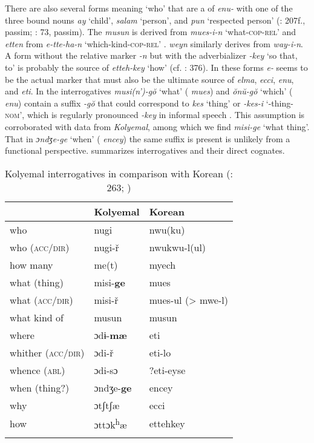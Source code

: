 There are also several forms meaning ‘who’ that are a  of \textit{enu-} with one of the three bound nouns \textit{ay} ‘child’, \textit{salam} ‘person’, and \textit{pun} ‘respected person’ (\citealt{Sohn1999}: 207f., passim; \citealt{Song2005}: 73, passim). The  \textit{musun} is derived from \textit{mues-i-n} ‘what-\textsc{cop}-\textsc{rel}’ and \textit{etten} from \textit{e-tte-ha-n} ‘which-kind-\textsc{cop}-\textsc{rel}’ \citep[256]{Sohn1999}.  \textit{weyn} similarly derives from \textit{way-i-n}. A form without the relative marker \textit{-n} but with the adverbializer \textit{-}\textit{key} ‘so that, to’ is probably the source of \textit{etteh-}\textit{key} ‘how’ (cf. \citealt{Sohn1999}: 376). In these forms \textit{e-} seems to be the actual  marker that must also be the ultimate source of \textit{elma}, \textit{ecci}, \textit{enu}, and \textit{eti}. In  the interrogatives \textit{musi(n’)-gŏ} ‘what’ ( \textit{mues}) and \textit{ŏnŭ-gŏ} ‘which’ ( \textit{enu}) contain a suffix \textit{-gŏ} that could correspond to  \textit{kes} ‘thing’ or \textit{-kes-i} ‘-thing-\textsc{nom}’, which is regularly pronounced \textit{-key} in informal speech \citep[155]{Song2005}. This assumption is corroborated with data from \textit{Kolyemal}, among which we find \textit{misi-ge} ‘what thing’. That in  \textit{ɔndʒe-ge} ‘when’ ( \textit{encey}) the same suffix is present is unlikely from a functional perspective.  summarizes  interrogatives and their direct  cognates.

\begin{table}
\caption{Kolyemal interrogatives in comparison with Korean (\citealt{King1987}: 263; \citealt{Sohn1999})}
\label{tab:kore:9}

\begin{tabularx}{\textwidth}{XXl}
\lsptoprule
& \textbf{Kolyemal} & \textbf{Korean}\\
\midrule
who & nugi & nwu(ku)\\
who (\textsc{acc/dir}) & nugi-ř & nwukwu-l(ul)\\
how many & me(t) & myech\\
what (thing) & misi-\textbf{ge} & mues\\
what (\textsc{acc/dir}) & misi-ř & mues-ul (> mwe-l)\\
what kind of & musun & musun\\
where & ɔdɨ-\textbf{mæ} & eti\\
whither (\textsc{acc/dir}) & ɔdi-ř & eti-lo\\
whence (\textsc{abl}) & ɔdi-sɔ & ?eti-eyse\\
when (thing?) & ɔndʒe-\textbf{ge} & encey\\
why & ɔtʃtʃæ & ecci\\
how & ɔttɔk\textsuperscript{h}æ & ettehkey\\
\lspbottomrule
\end{tabularx}
\end{table}

